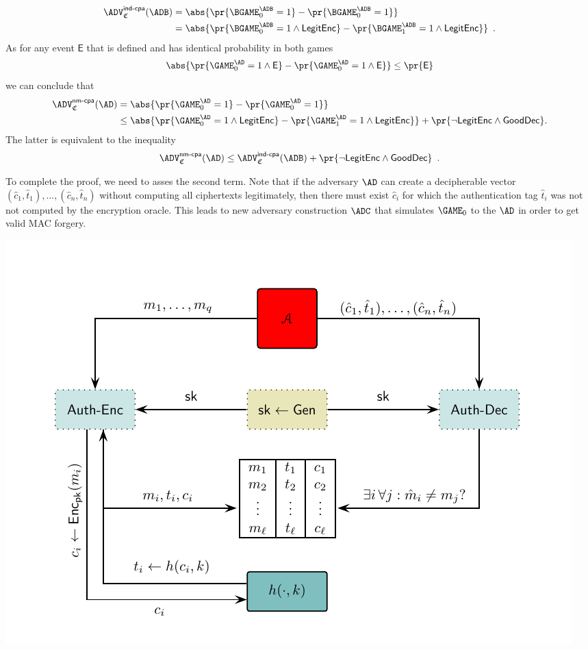 \documentclass{crypto-exercise}
\newcommand{\ADVNMCPA}[2]{\ADV^{\mathsf{nm\text{-}cpa}}_{#1}{(#2)}}
\newcommand{\CS}{\mathfrak{C}}
\newcommand{\LENC}{\mathsf{LegitEnc}}
\newcommand{\GDEC}{\mathsf{GoodDec}}
\begin{document}
\begin{solution}
\begin{align*}
\ADVINDCPA{\CS}{\ADB}&=
\abs{\pr{\BGAME_0^\ADB=1}-\pr{\BGAME_0^\ADB=1}}\\
&=\abs{\pr{\BGAME_0^\ADB=1\wedge\LENC}-\pr{\BGAME_1^\ADB=1\wedge\LENC}}\enspace.
\end{align*}
As for any event $\mathsf{E}$ that is defined and has identical probability in both games 
\begin{align*}
\abs{\pr{\GAME_0^\AD=1\wedge \mathsf{E}}-\pr{\GAME_0^\AD=1\wedge \mathsf{E}}}\leq \pr{\mathsf{E}}
\end{align*}
we can conclude that  
\begin{align*}
\ADVNMCPA{\CS}{\AD}&=
\abs{\pr{\GAME_0^\AD=1}-\pr{\GAME_0^\AD=1}}\\
&\leq\abs{\pr{\GAME_0^\AD=1\wedge\LENC}-\pr{\GAME_1^\AD=1\wedge\LENC}}
+\pr{\neg\LENC\wedge\GDEC}.
\end{align*}
The latter is equivalent to the inequality  
\begin{align*}
\ADVNMCPA{\CS}{\AD}\leq \ADVINDCPA{\CS}{\ADB} + \pr{\neg\LENC\wedge\GDEC} 
\enspace.
\end{align*}

To complete the proof, we need to asses the second term. Note that if the adversary $\AD$ can create a decipherable vector $(\hat{c}_1,\hat{t}_1),\ldots, (\hat{c}_n,\hat{t}_n)$ without computing all ciphertexts legitimately, then there must exist $\hat{c}_i$ for which the authentication tag $\hat{t}_i$ was not not computed by the encryption oracle. This leads to new adversary construction $\ADC$ that simulates $\GAME_0$ to the $\AD$ in order to get valid MAC forgery.

\begin{center}
\includegraphics{figures/0603-decryption-simulator-for-mac}
\end{center}


\end{solution}
\end{document}
